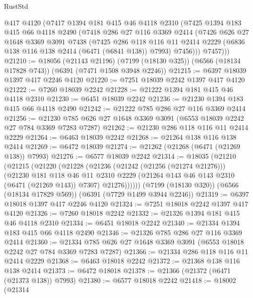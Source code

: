 \begin{lexlean}{RustStd}
\begin{coremodule}
{\begin{coremodule}
{{{{{{{{{{{{{{{{{{{{{{{{{{      @417
      @4120
      (@7417
        @1394
        @181
        @415
        @46
        @4118
        @2310
        (@7425
          @1394
          @183
          @415
          @66
          @4118
          @2490
          (@7418
            @286
            @27
            @116
            @3369
            @2414
            (@7426
              @626
              @27
              @1648
              @3369
              @3091
              @7438
              (@7425
                @286
                @118
                @116
                @11
                @2414
                @2229
                (@6836 @138 @116 @138 @2414 (@6471 (@6841 @138)) @7993)
                @7456)))
          @7457)))
@21210 := @18056
    (@21143 @21196)
    (@7199 (@18130 @325))
    (@6566 (@18134 @17828 @743))
    (@6391 (@7471 @1508 @3948 @2246))
@21215 := @6397 @18039 @1397 @417 @2246 @4120
@21220 := @7251 @18039 @2242 @1397 @417 @4120
@21222 := @7260 @18039 @2242
@21228 := @21222 @1394 @181 @415 @46 @4118 @2310
@21230 := @6451 @18039 @2242
@21236 := @21230 @1394 @183 @415 @66 @4118 @2490
@21242 := @21222 @785 @286 @27 @116 @3369 @2414
@21256 := @21230 @785 @626 @27 @1648 @3369 @3091 (@6553 @18039 @2242 @27 @784 @3369 @7283 @7287)
@21262 := @21230 @286 @118 @116 @11 @2414 @2229
@21264 := @6463 @18039 @2242
@21268 := @21264 @138 @116 @138 @2414
@21269 := @6472 @18039
@21274 := @21262 (@21268 (@6471 (@21269 @138)) @7993)
@21276 := @6577 @18039 @2242
@21314 := @18035
    (@21210
      (@21215
        (@21220
          (@21228
            (@21236
              (@21242 (@21256 (@21274 @21276)))
              (@21230
                @181
                @118
                @46
                @11
                @2310
                @2229
                (@21264 @143 @46 @143 @2310 (@6471 (@21269 @143)) @7307)
                @21276))))))
    (@7199 (@18130 @320))
    (@6566 (@18134 @17829 @569))
    (@6391 (@7729 @1499 @3944 @2246))
@21319 := @6397 @18018 @1397 @417 @2246 @4120
@21324 := @7251 @18018 @2242 @1397 @417 @4120
@21326 := @7260 @18018 @2242
@21332 := @21326 @1394 @181 @415 @46 @4118 @2310
@21334 := @6451 @18018 @2242
@21340 := @21334 @1394 @183 @415 @66 @4118 @2490
@21346 := @21326 @785 @286 @27 @116 @3369 @2414
@21360 := @21334 @785 @626 @27 @1648 @3369 @3091 (@6553 @18018 @2242 @27 @784 @3369 @7283 @7287)
@21366 := @21334 @286 @118 @116 @11 @2414 @2229
@21368 := @6463 @18018 @2242
@21372 := @21368 @138 @116 @138 @2414
@21373 := @6472 @18018
@21378 := @21366 (@21372 (@6471 (@21373 @138)) @7993)
@21380 := @6577 @18018 @2242
@21418 := @18002
    (@21314
}}}}}}}}}}}}}}}}}}}}}}}}}}
\end{coremodule}}
\end{coremodule}
\end{lexlean}
